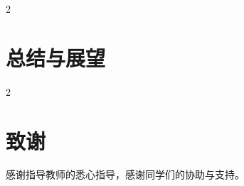 \documentclass[twoside]{CUGThesis}
\begin{document}
\begin{spacing}{2}
\section{总结与展望}
\end{spacing}
\label{sec:conclusion}



\begin{spacing}{2}
\section*{致谢}
\end{spacing}
{}

感谢指导教师的悉心指导，感谢同学们的协助与支持。

\clearpage


{}
\end{document}
